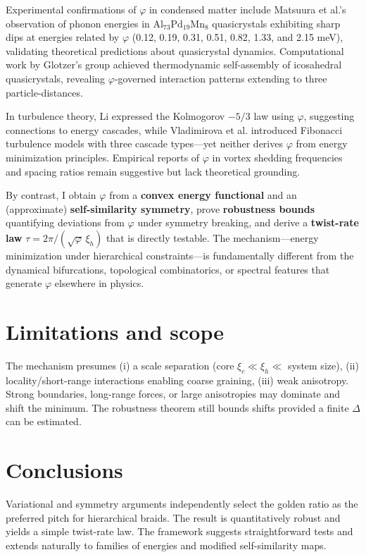 \documentclass[11pt]{article}
\theoremstyle{remark}
\theoremstyle{definition}
\newcommand{\ph}{\varphi}
\begin{document}
Experimental confirmations of $\ph$ in condensed matter include Matsuura et al.'s \cite{matsuura2024} observation of phonon energies in Al$_{73}$Pd$_{19}$Mn$_8$ quasicrystals exhibiting sharp dips at energies related by $\ph$ (0.12, 0.19, 0.31, 0.51, 0.82, 1.33, and 2.15 meV), validating theoretical predictions about quasicrystal dynamics. Computational work by Glotzer's group \cite{glotzer2015} achieved thermodynamic self-assembly of icosahedral quasicrystals, revealing $\ph$-governed interaction patterns extending to three particle-distances.

In turbulence theory, Li \cite{li2013} expressed the Kolmogorov $-5/3$ law using $\ph$, suggesting connections to energy cascades, while Vladimirova et al. \cite{vladimirova2021} introduced Fibonacci turbulence models with three cascade types---yet neither derives $\ph$ from energy minimization principles. Empirical reports of $\ph$ in vortex shedding frequencies \cite{schewe1983} and spacing ratios remain suggestive but lack theoretical grounding.

By contrast, I obtain $\ph$ from a \textbf{convex energy functional} and an (approximate) \textbf{self-similarity symmetry}, prove \textbf{robustness bounds} quantifying deviations from $\ph$ under symmetry breaking, and derive a \textbf{twist-rate law} $\tau=2\pi/(\sqrt{\ph}\,\xi_h)$ that is directly testable. The mechanism---energy minimization under hierarchical constraints---is fundamentally different from the dynamical bifurcations, topological combinatorics, or spectral features that generate $\ph$ elsewhere in physics.

\section{Limitations and scope}
The mechanism presumes (i) a scale separation (core $\xi_c\ll\xi_h\ll$ system size), (ii) locality/short-range interactions enabling coarse graining, (iii) weak anisotropy. Strong boundaries, long-range forces, or large anisotropies may dominate and shift the minimum. The robustness theorem still bounds shifts provided a finite $\Delta$ can be estimated.

\section{Conclusions}
Variational and symmetry arguments independently select the golden ratio as the preferred pitch for hierarchical braids. The result is quantitatively robust and yields a simple twist-rate law. The framework suggests straightforward tests and extends naturally to families of energies and modified self-similarity maps.
\end{document}

